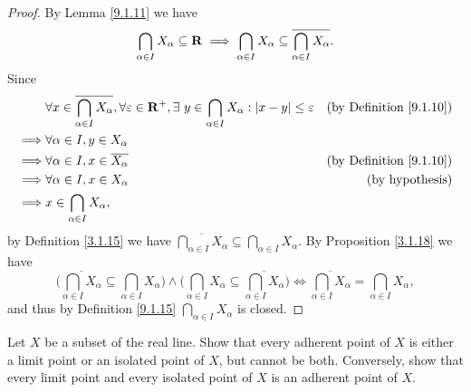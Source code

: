 \begin{proof}
    By Lemma \ref{9.1.11} we have
    \[
        \bigcap_{\alpha \in I} X_{\alpha} \subseteq \mathbf{R} \implies \bigcap_{\alpha \in I} X_{\alpha} \subseteq \overline{\bigcap_{\alpha \in I} X_{\alpha}}.
    \]
    Since
    \begin{align*}
                 & \forall x \in \overline{\bigcap_{\alpha \in I} X_{\alpha}}, \forall \varepsilon \in \mathbf{R}^+, \exists\ y \in \bigcap_{\alpha \in I} X_{\alpha} : \left\lvert x - y\right\rvert \leq \varepsilon & \text{(by Definition \ref{9.1.10})} \\
        \implies & \forall \alpha \in I, y \in X_{\alpha}                                                                                                                                                                          \\
        \implies & \forall \alpha \in I, x \in \overline{X_{\alpha}}                                                                                                                         & \text{(by Definition \ref{9.1.10})} \\
        \implies & \forall \alpha \in I, x \in X_{\alpha}                                                                                                                                    & \text{(by hypothesis)}              \\
        \implies & x \in \bigcap_{\alpha \in I} X_{\alpha},
    \end{align*}
    by Definition \ref{3.1.15} we have \(\overline{\bigcap_{\alpha \in I} X_{\alpha}} \subseteq \bigcap_{\alpha \in I} X_{\alpha}\).
    By Proposition \ref{3.1.18} we have
    \[
        \bigg(\overline{\bigcap_{\alpha \in I} X_{\alpha}} \subseteq \bigcap_{\alpha \in I} X_{\alpha}\bigg) \land \bigg(\bigcap_{\alpha \in I} X_{\alpha} \subseteq \overline{\bigcap_{\alpha \in I} X_{\alpha}}\bigg) \iff \overline{\bigcap_{\alpha \in I} X_{\alpha}} = \bigcap_{\alpha \in I} X_{\alpha},
    \]
    and thus by Definition \ref{9.1.15} \(\bigcap_{\alpha \in I} X_{\alpha}\) is closed.
\end{proof}

\begin{exercise}\label{ex 9.1.9}
    Let \(X\) be a subset of the real line.
    Show that every adherent point of \(X\) is either a limit point or an isolated point of \(X\), but cannot be both.
    Conversely, show that every limit point and every isolated point of \(X\) is an adherent point of \(X\).
\end{exercise}

